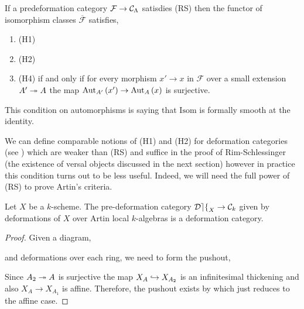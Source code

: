 \documentclass[12pt]{article}
\newcommand{\cDef}{\mathcal{Def}}
\renewcommand{\F}{\mathcal{F}}
\begin{document}
\begin{prop}
If a predeformation category $\F \to \C_\Lambda$ satisdies (RS) then the functor of isomorphism classes $\overline{\F}$ satisfies,
\begin{enumerate}
\item (H1)
\item (H2)
\item (H4) if and only if for every morphism $x' \to x$ in $\F$ over a small extension $A' \onto A$ the map $\Aut[A']{x'} \to \Aut[A]{x}$ is surjective.
\end{enumerate}
\end{prop}

\begin{rmk}
This condition on automorphisms is saying that $\mathrm{Isom}$ is formally smooth at the identity. 
\end{rmk}

\begin{rmk}
We can define comparable notions of (H1) and (H2) for deformation categories (see ) which are weaker than (RS) and suffice in the proof of Rim-Schlessinger (the existence of versal objects discussed in the next section) however in practice this condition turns out to be less useful. Indeed, we will need the full power of (RS) to prove Artin's criteria.
\end{rmk}

\begin{prop}
Let $X$ be a $k$-scheme. The pre-deformation category $\cDef_X \to \C_k$ given by deformations of $X$ over Artin local $k$-algebras is a deformation category.
\end{prop}

\begin{proof}
Given a diagram,
\begin{center}
\end{center}
and deformations over each ring, we need to form the pushout,
\begin{center}
\end{center}
Since $A_2 \onto A$ is surjective the map $X_A \embed X_{A_2}$ is an infinitesimal thickening and also $X_{A} \to X_{A_1}$ is affine. Therefore, the pushout exists by  which just reduces to the affine case.
\end{proof}
\end{document}
